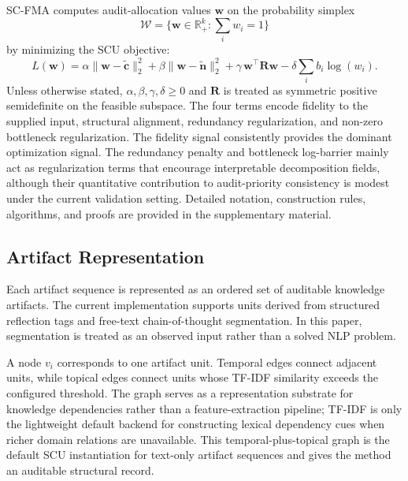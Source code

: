 \documentclass[a4paper,fleqn]{cas-sc}
\begin{document}
SC-FMA computes audit-allocation values $\mathbf{w}$ on the probability simplex
\begin{equation}
\mathcal{W}=\{\mathbf{w}\in\mathbb{R}_{+}^{k}: \sum_i w_i = 1\}
\label{eq:scu-feasible-set}
\end{equation}
by minimizing the SCU objective:
\begin{equation}
L(\mathbf{w}) =
\alpha\|\mathbf{w} - \tilde{\mathbf{c}}\|_2^2
+ \beta\|\mathbf{w} - \tilde{\mathbf{n}}\|_2^2
+ \gamma\,\mathbf{w}^{\top}\mathbf{R}\mathbf{w}
- \delta\sum_i b_i \log(w_i).
\label{eq:scu}
\end{equation}
Unless otherwise stated, $\alpha,\beta,\gamma,\delta \ge 0$ and $\mathbf{R}$ is treated as symmetric positive semidefinite on the feasible subspace. The four terms encode fidelity to the supplied input, structural alignment, redundancy regularization, and non-zero bottleneck regularization. The fidelity signal consistently provides the dominant optimization signal. The redundancy penalty and bottleneck log-barrier mainly act as regularization terms that encourage interpretable decomposition fields, although their quantitative contribution to audit-priority consistency is modest under the current validation setting. Detailed notation, construction rules, algorithms, and proofs are provided in the supplementary material.

\subsection{Artifact Representation}

Each artifact sequence is represented as an ordered set of auditable knowledge artifacts. The current implementation supports units derived from structured reflection tags and free-text chain-of-thought segmentation. In this paper, segmentation is treated as an observed input rather than a solved NLP problem.

A node $v_i$ corresponds to one artifact unit. Temporal edges connect adjacent units, while topical edges connect units whose TF-IDF similarity exceeds the configured threshold. The graph serves as a representation substrate for knowledge dependencies rather than a feature-extraction pipeline; TF-IDF is only the lightweight default backend for constructing lexical dependency cues when richer domain relations are unavailable. This temporal-plus-topical graph is the default SCU instantiation for text-only artifact sequences and gives the method an auditable structural record.
\end{document}
